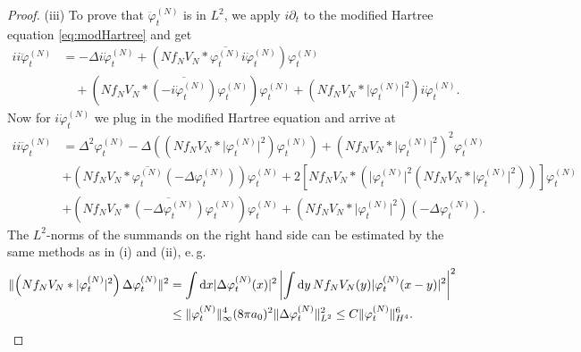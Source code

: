 \documentclass[11pt,a4paper,draft,DIV11]{scrartcl}	%
\newcommand{\di}{\textrm{d}}		%
\newcommand{\cc}[1]{\overline{#1}}	%
\newcommand{\norm}[1]{\lVert#1\rVert}	%
\newcommand{\ph}{\varphi_t^{(N)}}	%
\newcommand{\phdot}{\dot{\varphi}_t^{(N)}}	%
\newcommand{\phddot}{\ddot{\varphi}_t^{(N)}}	%
\newcommand{\eqr}[1]{\eqref{eq:#1}}			%
\begin{document}
\begin{proof}
(iii) To prove that $\phddot$ is in $L^2$, we apply $i\partial_t$ to the modified Hartree equation \eqr{modHartree} and get
\begin{align*}
ii\phddot & = - \Delta i \phdot + \left( N f_N V_N \ast \cc{\ph}i \phdot \right) \ph \\
& \quad + \left( N f_N V_N \ast \cc{(-i\phdot)} \ph \right) \ph + \left( N f_N V_N \ast \lvert\ph\rvert^2 \right) i\phdot.
\end{align*}
Now for $i\phdot$ we plug in the modified Hartree equation and arrive at
\begin{align*}
ii \phddot & = \Delta^2 \ph - \Delta \left( (N f_N V_N \ast \lvert \ph\rvert^2)\ph \right) + \left( N f_N V_N \ast \lvert \ph\rvert^2 \right)^2 \ph \\
& + (N f_N V_N \ast \cc{\ph}(-\Delta \ph))\ph + 2 \left[ N f_N V_N \ast \left( \lvert \ph\rvert^2 (N f_N V_N \ast \lvert \ph\rvert^2) \right) \right] \ph \\
& + (N f_N V_N \ast \cc{(-\Delta \ph)} \ph)\ph + \left( N f_N V_N \ast \lvert \ph \rvert^2 \right)(-\Delta \ph).
\end{align*}
The $L^2$-norms of the summands on the right hand side can be estimated by the same methods as in (i) and (ii), e.\,g.\ 
\begin{align*}
 \norm{\left( N f_N V_N \ast \lvert \ph\rvert^2 \right) \Delta \ph}^2 & = \int \di x \lvert \Delta \ph(x)\rvert^2 \left\lvert \int \di y\, N f_N V_N(y) \lvert \ph(x-y) \rvert^2 \right\rvert^2 \\
& \leq \norm{\ph}_\infty^4 (8 \pi a_0)^2 \norm{\Delta \ph}_{L^2}^2 \leq C \norm{\ph}_{H^4}^6. \qedhere
\end{align*}
\end{proof}
\end{document}

